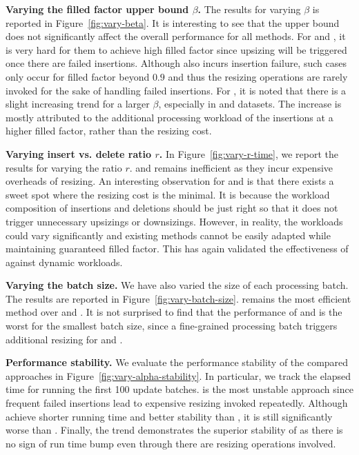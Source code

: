 \vspace{1mm}\noindent\textbf{Varying the filled factor upper bound $\beta$.}
The results for varying $\beta$ is reported in Figure~\ref{fig:vary-beta}. 
It is interesting to see that the upper bound does not significantly affect the overall performance for all methods. 
For \linear and \megakv, it is very hard for them to achieve high filled factor since upsizing will be triggered once there are failed insertions.
Although \voter also incurs insertion failure, such cases only occur for filled factor beyond $0.9$ and thus the resizing operations are rarely invoked for the sake of handling failed insertions. 
For \voter, it is noted that there is a slight increasing trend for a larger $\beta$, especially in \dsreddit and \dsrandom datasets. 
The increase is mostly attributed to the additional processing workload of the insertions at a higher filled factor, rather than the resizing cost. 



\vspace{1mm}\noindent\textbf{Varying insert vs. delete ratio $r$.}
In Figure~\ref{fig:vary-r-time}, we report the results for varying the ratio $r$. \linear and \megakv remains inefficient as they incur expensive overheads of resizing. An interesting observation for \linear and \megakv is that there exists a sweet spot where the resizing cost is the minimal.
It is because the workload composition of insertions and deletions should be just right so that it does not trigger unnecessary upsizings or downsizings. However, in reality, the workloads could vary significantly and existing methods cannot be easily adapted while maintaining guaranteed filled factor. This has again validated the effectiveness of \voter against dynamic workloads.



\vspace{1mm}\noindent\textbf{Varying the batch size.}
We have also varied the size of each processing batch. The results are reported in Figure~\ref{fig:vary-batch-size}. \voter remains the most efficient method over \linear and \megakv. It is not surprised to find that the performance of \linear and \megakv is the worst for the smallest batch size, since a fine-grained processing batch triggers additional resizing for \linear and \megakv. 

\vspace{1mm}\noindent\textbf{Performance stability.}
We evaluate the performance stability of the compared approaches in Figure~\ref{fig:vary-alpha-stability}. 
In particular, we track the elapsed time for running the first 100 update batches. \megakv is the most unstable approach since frequent failed insertions lead to expensive resizing invoked repeatedly. Although \linear achieve shorter running time and better stability than \megakv, it is still significantly worse than \voter. Finally, the trend demonstrates the superior stability of \voter as there is no sign of run time bump even through there are resizing operations involved. 




